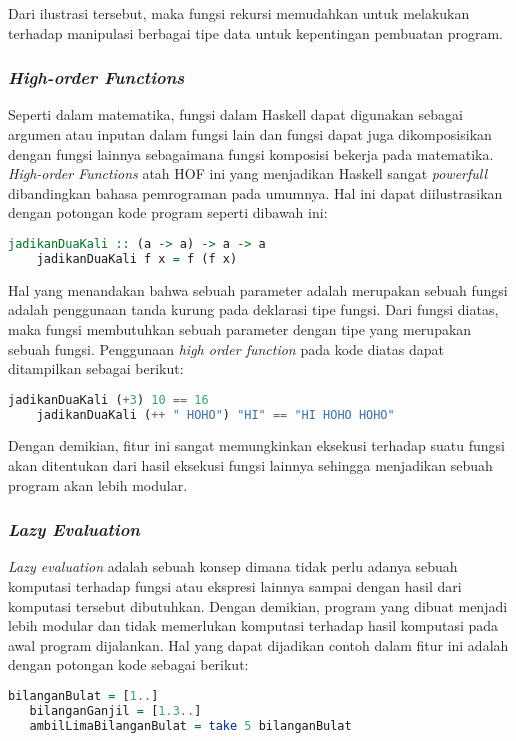 \documentclass[pi.tex]{subfile}
\begin{document}
  \hspace{8pt}Dari ilustrasi tersebut, maka fungsi rekursi memudahkan untuk melakukan terhadap manipulasi berbagai tipe data untuk kepentingan pembuatan program.

  \subsubsection{\emph{High-order Functions}}\hspace{8pt}
  Seperti dalam matematika, fungsi dalam Haskell dapat digunakan sebagai argumen atau inputan dalam fungsi lain dan fungsi dapat juga dikomposisikan dengan fungsi lainnya sebagaimana fungsi komposisi bekerja pada matematika.  \emph{High-order Functions} atah HOF ini yang menjadikan Haskell sangat \emph{powerfull} dibandingkan bahasa pemrograman pada umumnya. Hal ini dapat diilustrasikan dengan potongan kode program seperti dibawah ini:\\
  \begin{lstlisting}[language=Haskell]
    jadikanDuaKali :: (a -> a) -> a -> a  
    jadikanDuaKali f x = f (f x) 
  \end{lstlisting}

  \hspace{8pt}Hal yang menandakan bahwa sebuah parameter adalah merupakan sebuah fungsi adalah penggunaan tanda kurung \fhaskell{()} pada deklarasi tipe fungsi. Dari fungsi diatas, maka fungsi  membutuhkan sebuah parameter dengan tipe  yang merupakan sebuah fungsi. Penggunaan \emph{high order function} pada kode diatas dapat ditampilkan sebagai berikut:\\

  \begin{lstlisting}[language=Haskell]
    jadikanDuaKali (+3) 10 == 16
    jadikanDuaKali (++ " HOHO") "HI" == "HI HOHO HOHO"
  \end{lstlisting}

\hspace{8pt}Dengan demikian, fitur ini sangat memungkinkan eksekusi terhadap suatu fungsi akan ditentukan dari hasil eksekusi fungsi lainnya sehingga menjadikan sebuah program akan lebih modular.

\subsubsection{\emph{Lazy Evaluation}}\hspace{8pt}
\emph{Lazy evaluation} adalah sebuah konsep dimana tidak perlu adanya sebuah komputasi terhadap fungsi atau ekspresi lainnya sampai dengan hasil dari komputasi tersebut dibutuhkan. Dengan demikian, program yang dibuat menjadi lebih modular dan tidak memerlukan komputasi terhadap hasil komputasi pada awal program dijalankan. Hal yang dapat dijadikan contoh dalam fitur ini adalah dengan potongan kode sebagai berikut:\\
 \begin{lstlisting}[language=Haskell]
   bilanganBulat = [1..]
   bilanganGanjil = [1.3..]
   ambilLimaBilanganBulat = take 5 bilanganBulat
  \end{lstlisting}
\end{document}
